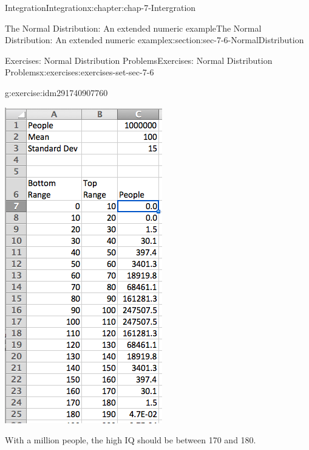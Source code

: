 \documentclass[oneside,10pt,]{book}
\numberwithin{equation}{section}
\begin{document}
\begin{chapterptx}{Integration}{}{Integration}{}{}{x:chapter:chap-7-Intergration}
\begin{sectionptx}{The Normal Distribution: An extended numeric example}{}{The Normal Distribution: An extended numeric example}{}{}{x:section:sec-7-6-NormalDistribution}
\begin{exercises-subsection}{Exercises: Normal Distribution Problems}{}{Exercises: Normal Distribution Problems}{}{}{x:exercises:exercises-set-sec-7-6}
\begin{divisionexercise}{9}{}{}{g:exercise:idm291740907760}
\begin{sidebyside}{1}{0.3}{0.3}{0}
\begin{sbspanel}{0.4}
\includegraphics[width=\linewidth]{images/sec7-6-sol9b.png}
\end{sbspanel}%
\end{sidebyside}%
\par
With a million people, the high IQ should be between 170 and 180.%

\end{divisionexercise}
\end{exercises-subsection}
\end{sectionptx}
\end{chapterptx}
\end{document}
